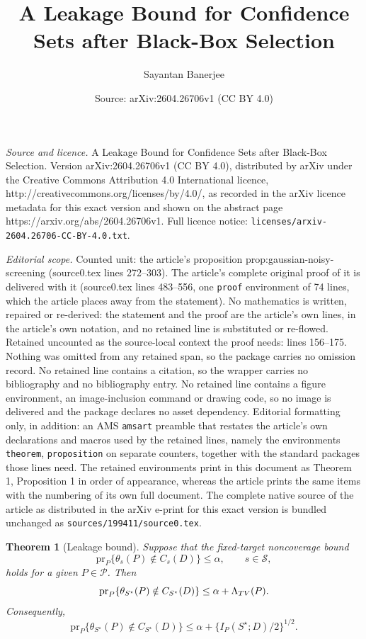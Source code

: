 \documentclass[10pt,a4paper]{amsart}
\title{A Leakage Bound for Confidence Sets after Black-Box Selection}
\author{Sayantan Banerjee}
\date{Source: arXiv:2604.26706v1 (CC BY 4.0)}
\newtheorem{theorem}{Theorem}
\newcommand{\calP}{\mathcal P}
\newcommand{\calS}{\mathcal S}
\begin{document}
\maketitle

\noindent\emph{Source and licence.} A Leakage Bound for Confidence Sets after Black-Box Selection. Version arXiv:2604.26706v1 (CC BY 4.0), distributed by arXiv under the Creative Commons Attribution 4.0 International licence, http://creativecommons.org/licenses/by/4.0/, as recorded in the arXiv licence metadata for this exact version and shown on the abstract page https://arxiv.org/abs/2604.26706v1. Full licence notice: \texttt{licenses/arxiv-2604.26706-CC-BY-4.0.txt}.\par\smallskip

\noindent\textit{Editorial scope.} Counted unit: the article's proposition prop:gaussian-noisy-screening (source0.tex lines 272--303). The article's complete original proof of it is delivered with it (source0.tex lines 483--556, one \texttt{proof} environment of 74 lines, which the article places away from the statement). No mathematics is written, repaired or re-derived: the statement and the proof are the article's own lines, in the article's own notation, and no retained line is substituted or re-flowed.  Retained uncounted as the source-local context the proof needs: lines 156--175.  Nothing was omitted from any retained span, so the package carries no omission record.  No retained line contains a citation, so the wrapper carries no bibliography and no bibliography entry.  No retained line contains a figure environment, an image-inclusion command or drawing code, so no image is delivered and the package declares no asset dependency.  Editorial formatting only, in addition: an AMS \texttt{amsart} preamble that restates the article's own declarations and macros used by the retained lines, namely the environments \texttt{theorem}, \texttt{proposition} on separate counters, together with the standard packages those lines need.  The retained environments print in this document as Theorem 1, Proposition 1 in order of appearance, whereas the article prints the same items with the numbering of its own full document.  The complete native source of the article as distributed in the arXiv e-print for this exact version is bundled unchanged as \texttt{sources/199411/source0.tex}.
\begin{theorem}[Leakage bound]
	\label{thm:tv-leakage}
	Suppose that the fixed-target noncoverage bound
	\[
	\mathrm{pr}_P\{\theta_s(P)\notin C_s(D)\}\leq \alpha,
	\qquad s\in\calS,
	\]
	holds for a given \(P\in\calP\). Then
	\[
	\mathrm{pr}_P\{\theta_{S^\star}(P)\notin C_{S^\star}(D)\}
	\leq
	\alpha+\Lambda_{\rm TV}(P).
	\]
	Consequently,
	\[
	\mathrm{pr}_P\{\theta_{S^\star}(P)\notin C_{S^\star}(D)\}
	\leq
	\alpha+\{I_P(S^\star;D)/2\}^{1/2}.
	\]
\end{theorem}
\end{document}
